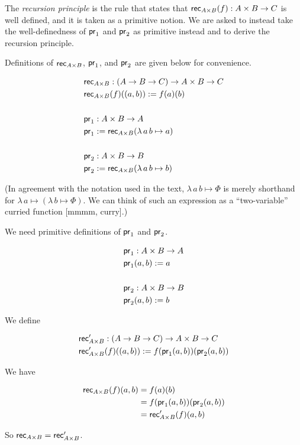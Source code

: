 \documentclass{book}
\begin{document}
The \emph{recursion principle} is the rule that states that
${\mathsf{rec}_{A \times B} (f) : A \times B \to C}$ is well defined,
and it is taken as a primitive notion.
We are asked to instead take the well-definedness of ${\mathsf{pr}_{1}}$ and
${\mathsf{pr}_{2}}$ as primitive instead and to derive the recursion principle.

Definitions of ${\mathsf{rec}_{A \times B}}$, ${\mathsf{pr}_{1}}$, and ${\mathsf{pr}_{2}}$ are
given below for convenience.

\begin{align*}
  &\mathsf{rec}_{A \times B} : (A \to B \to C) \to A \times B \to C \\
  &\mathsf{rec}_{A \times B} (f) ((a,b)) := f (a) (b) \\
  \\
  &\mathsf{pr}_{1} : A \times B \to A \\
  &\mathsf{pr}_{1} := \mathsf{rec}_{A \times B} (\lambda \, a \, b \mapsto a) \\
  \\
  &\mathsf{pr}_{2} : A \times B \to B \\
  &\mathsf{pr}_{2} := \mathsf{rec}_{A \times B} (\lambda \, a \, b \mapsto b) \\
\end{align*}

(In agreement with the notation used in the text,
${\lambda \, a \, b \mapsto \Phi}$ is merely shorthand for
${\lambda \, a \mapsto (\lambda \, b \mapsto \Phi)}$. We can think of
such an expression as a ``two-variable'' curried function [mmmm,
curry].)

We need primitive definitions of ${\mathsf{pr}_{1}}$ and ${\mathsf{pr}_{2}}$.

\begin{align*}
  &\mathsf{pr}_{1} : A \times B \to A \\
  &\mathsf{pr}_{1} (a,b) := a \\
  \\
  &\mathsf{pr}_{2} : A \times B \to B \\
  &\mathsf{pr}_{2} (a,b) := b \\
\end{align*}

We define

\begin{align*}
  &\mathsf{rec}_{A \times B}' : (A \to B \to C) \to A \times B \to C \\
  &\mathsf{rec}_{A \times B}' (f) ((a,b)) := f (\mathsf{pr}_{1} (a,b)) (\mathsf{pr}_{2} (a,b)) \\
\end{align*}

We have

\begin{align*}
  \mathsf{rec}_{A \times B} (f) (a,b)
  &= f (a) (b) \\
  &= f (\mathsf{pr}_{1} (a,b)) (\mathsf{pr}_{2} (a,b)) \\
  &= \mathsf{rec}_{A \times B}' (f) (a,b) \\
\end{align*}

So ${\mathsf{rec}_{A \times B} = \mathsf{rec}_{A \times B}'}$.
\end{document}
